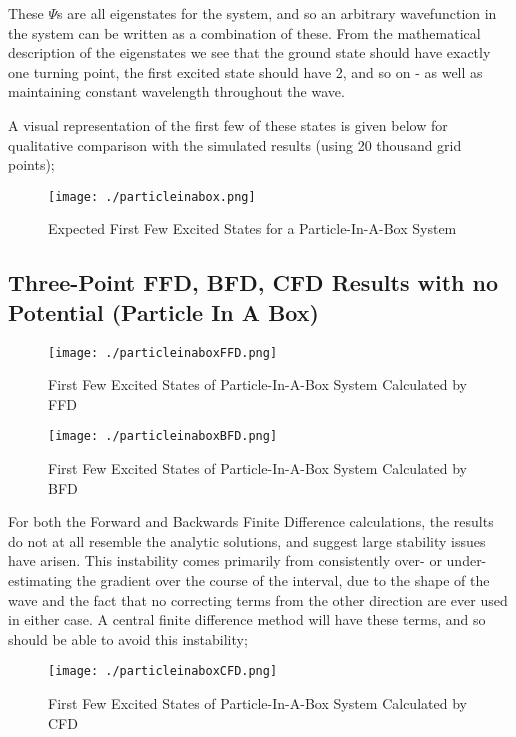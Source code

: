 These $\Psi$s are all eigenstates for the system, and so an arbitrary wavefunction in the system can be written as a combination of these. From the mathematical description of the eigenstates we see that the ground state should have exactly one turning point, the first excited state should have 2, and so on - as well as maintaining constant wavelength throughout the wave.

A visual representation of the first few of these states is given below for qualitative comparison with the simulated results (using 20 thousand grid points);

\begin{figure}[H]
	\texttt{[image: ./particleinabox.png]}
	\centering
	\caption{Expected First Few Excited States for a Particle-In-A-Box System}
\end{figure}

\subsection{Three-Point FFD, BFD, CFD Results with no Potential (Particle In A Box)}
\begin{figure}[H]
	\texttt{[image: ./particleinaboxFFD.png]}
	\centering
	\caption{First Few Excited States of Particle-In-A-Box System Calculated by FFD}
\end{figure}

\begin{figure}[H]
	\texttt{[image: ./particleinaboxBFD.png]}
	\centering
	\caption{First Few Excited States of Particle-In-A-Box System Calculated by BFD}
\end{figure}

For both the Forward and Backwards Finite Difference calculations, the results do not at all resemble the analytic solutions, and suggest large stability issues have arisen. This instability comes primarily from consistently over- or under-estimating the gradient over the course of the interval, due to the shape of the wave and the fact that no correcting terms from the other direction are ever used in either case. A central finite difference method will have these terms, and so should be able to avoid this instability;

\begin{figure}[H]
	\texttt{[image: ./particleinaboxCFD.png]}
	\centering
	\caption{First Few Excited States of Particle-In-A-Box System Calculated by CFD}
\end{figure}

